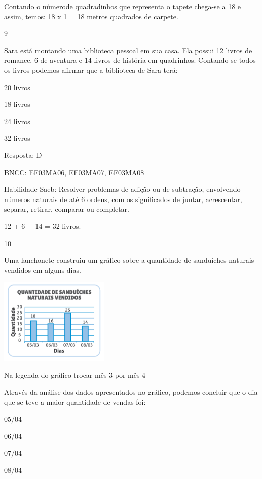 \begin{escolha}
\begin{escolha}
Contando o númerode quadradinhos que representa o tapete chega-se a 18 e
assim, temos: 18 x 1 = 18 metros quadrados de carpete.

\num{9}

Sara está montando uma biblioteca pessoal em sua casa. Ela possui 12
livros de romance, 6 de aventura e 14 livros de história em quadrinhos.
Contando-se todos os livros podemos afirmar que a biblioteca de Sara
terá:

\begin{escolha}
\item
  20 livros
\item
  18 livros
\item
  24 livros
\item
  32 livros
\end{escolha}

Resposta: D

BNCC: EF03MA06, EF03MA07, EF03MA08

Habilidade Saeb: Resolver problemas de adição ou de subtração,
envolvendo números naturais de até 6 ordens, com os significados de
juntar, acrescentar, separar, retirar, comparar ou completar.

12 + 6 + 14 = 32 livros.

\num{10}

Uma lanchonete construiu um gráfico sobre a quantidade de sanduíches
naturais vendidos em alguns dias.

\includegraphics[width=2.05128in,height=1.61850in]{media/image124.png}

Na legenda do gráfico trocar mês 3 por mês 4

Através da análise dos dados apresentados no gráfico, podemos concluir
que o dia que se teve a maior quantidade de vendas foi:

\begin{escolha}

\item
  05/04
\item
  06/04
\item
  07/04
\item
  08/04
\end{escolha}


\end{escolha}
\end{escolha}
